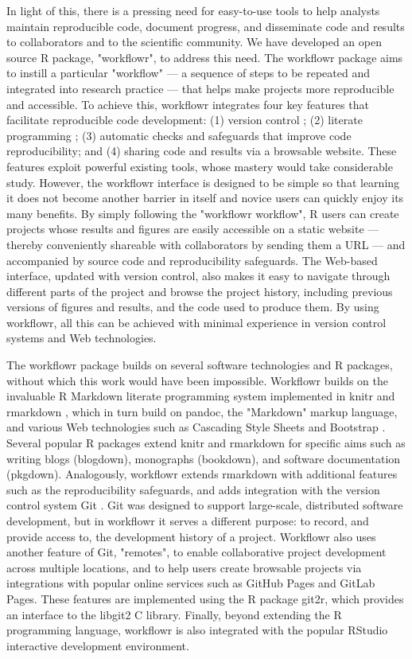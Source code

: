 \documentclass[9pt,a4paper]{extarticle}
\begin{document}
In light of this, there is a pressing need for easy-to-use tools to help
analysts maintain reproducible code, document progress, and disseminate
code and results to collaborators and to the scientific community. We
have developed an open source R \cite{R2019} package, "workflowr", to
address this need. The workflowr package aims to instill a particular
"workflow" --- a sequence of steps to be repeated and integrated into
research practice --- that helps make projects more reproducible and
accessible. To achieve this, workflowr integrates four key features that
facilitate reproducible code development: (1) version control
\cite{Loeliger2012, Chacon2014}; (2) literate programming
\cite{Xie2018}; (3) automatic checks and safeguards that improve code
reproducibility; and (4) sharing code and results via a browsable
website. These features exploit powerful existing tools, whose mastery
would take considerable study. However, the workflowr interface is
designed to be simple so that learning it does not become another
barrier in itself and novice users can quickly enjoy its many benefits.
By simply following the "workflowr workflow", R users can create
projects whose results and figures are easily accessible on a static
website --- thereby conveniently shareable with collaborators by sending
them a URL --- and accompanied by source code and reproducibility
safeguards. The Web-based interface, updated with version control, also
makes it easy to navigate through different parts of the project and
browse the project history, including previous versions of figures and
results, and the code used to produce them. By using workflowr, all this
can be achieved with minimal experience in version control systems and
Web technologies.

The workflowr package builds on several software technologies and R
packages, without which this work would have been impossible. Workflowr
builds on the invaluable R Markdown literate programming system
implemented in knitr \cite{Xie2014, knitr} and rmarkdown \cite{Xie2018,
rmarkdown}, which in turn build on pandoc, the "Markdown" markup
language, and various Web technologies such as Cascading Style Sheets
and Bootstrap \cite{Spurlock2013}. Several popular R packages extend
knitr and rmarkdown for specific aims such as writing blogs (blogdown),
monographs (bookdown), and software documentation (pkgdown).
Analogously, workflowr extends rmarkdown with additional features such
as the reproducibility safeguards, and adds integration with the version
control system Git \cite{Loeliger2012, Chacon2014}. Git was designed to
support large-scale, distributed software development, but in workflowr
it serves a different purpose: to record, and provide access to, the
development history of a project. Workflowr also uses another feature of
Git, "remotes", to enable collaborative project development across
multiple locations, and to help users create browsable projects via
integrations with popular online services such as GitHub Pages and
GitLab Pages. These features are implemented using the R package git2r,
which provides an interface to the libgit2 C library. Finally, beyond
extending the R programming language, workflowr is also integrated with
the popular RStudio interactive development environment.
\end{document}
